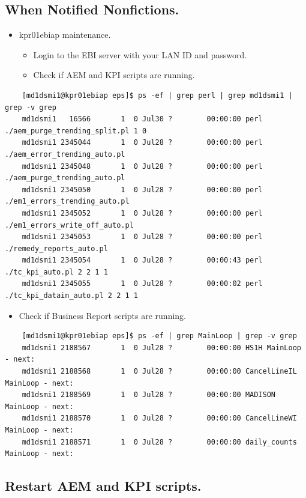 \documentclass[12pt,twoside]{article}
\begin{document}
\subsection{When Notified Nonfictions.}
\label{sec-4-7}

\begin{itemize}
\item kpr01ebiap maintenance.
\begin{itemize}
\item Login to the EBI server with your LAN ID and password.
\item Check if AEM and KPI scripts are running.
\end{itemize}
\end{itemize}
\begin{verbatim}
    [md1dsmi1@kpr01ebiap eps]$ ps -ef | grep perl | grep md1dsmi1 | grep -v grep
    md1dsmi1   16566       1  0 Jul30 ?        00:00:00 perl ./aem_purge_trending_split.pl 1 0
    md1dsmi1 2345044       1  0 Jul28 ?        00:00:00 perl ./aem_error_trending_auto.pl
    md1dsmi1 2345048       1  0 Jul28 ?        00:00:00 perl ./aem_purge_trending_auto.pl
    md1dsmi1 2345050       1  0 Jul28 ?        00:00:00 perl ./em1_errors_trending_auto.pl
    md1dsmi1 2345052       1  0 Jul28 ?        00:00:00 perl ./em1_errors_write_off_auto.pl
    md1dsmi1 2345053       1  0 Jul28 ?        00:00:00 perl ./remedy_reports_auto.pl
    md1dsmi1 2345054       1  0 Jul28 ?        00:00:43 perl ./tc_kpi_auto.pl 2 2 1 1
    md1dsmi1 2345055       1  0 Jul28 ?        00:00:02 perl ./tc_kpi_datain_auto.pl 2 2 1 1
\end{verbatim}
\begin{itemize}
\item Check if Business Report scripts are running.
\end{itemize}
\begin{verbatim}
    [md1dsmi1@kpr01ebiap eps]$ ps -ef | grep MainLoop | grep -v grep
    md1dsmi1 2188567       1  0 Jul28 ?        00:00:00 HS1H MainLoop - next: 
    md1dsmi1 2188568       1  0 Jul28 ?        00:00:00 CancelLineIL MainLoop - next:
    md1dsmi1 2188569       1  0 Jul28 ?        00:00:00 MADISON MainLoop - next: 
    md1dsmi1 2188570       1  0 Jul28 ?        00:00:00 CancelLineWI MainLoop - next:
    md1dsmi1 2188571       1  0 Jul28 ?        00:00:00 daily_counts MainLoop - next:
\end{verbatim}
\subsection{Restart AEM and KPI scripts.}
\label{sec-4-8}
\end{document}
